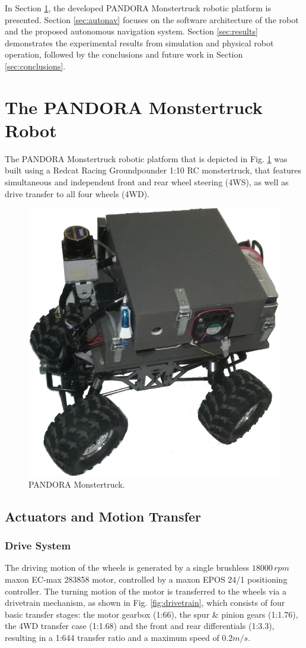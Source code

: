 \documentclass[conference]{IEEEtran}
\begin{document}
In Section \ref{sec:robot}, the developed PANDORA Monstertruck robotic platform is presented.  Section \ref{sec:autonav} focuses on the software architecture of the robot and the proposed autonomous navigation system. Section \ref{sec:results} demonstrates the experimental results from simulation and physical robot operation, followed by the conclusions and future work in Section \ref{sec:conclusions}.

\section{The PANDORA Monstertruck Robot} \label{sec:robot}
The PANDORA Monstertruck robotic platform that is depicted in Fig. \ref{fig:monstertruck} was built using a Redcat Racing Groundpounder 1:10 RC monstertruck, that features simultaneous and independent front and rear wheel steering (4WS), as well as drive transfer to all four wheels (4WD).

\begin{figure}[!ht]
	\centering
	\includegraphics[width=0.46\linewidth]{Figures/monstertruck3.png}
	\caption{PANDORA Monstertruck.}
	\label{fig:monstertruck}
\end{figure}

\subsection{Actuators and Motion Transfer}
\subsubsection{Drive System}
The driving motion of the wheels is generated by a single brushless $18000\, rpm$ maxon EC-max 283858 motor, controlled by a maxon EPOS 24/1 positioning controller. The turning motion of the motor is transferred to the wheels via a drivetrain mechanism, as shown in Fig. \ref{fig:drivetrain}, which consists of four basic transfer stages: the motor gearbox (1:66), the spur \& pinion gears (1:1.76), the 4WD transfer case (1:1.68) and the front and rear differentials (1:3.3), resulting in a 1:644 transfer ratio and a maximum speed of $0.2m/s$.
\end{document}
